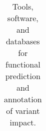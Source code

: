 \documentclass{article}
\begin{document}
\begin{table}[p]
\begin{tabularx}{\textwidth}{p{3cm}XXp{1.5cm}p{1.5cm}}
 
 
  
 
 
 
 
 
 
 
 
 
 
 
 
\end{tabularx}
\caption{Tools, software, and databases for functional prediction and annotation of variant impact. }
\label{table:3}
\end{table}
 
 
\end{document}
